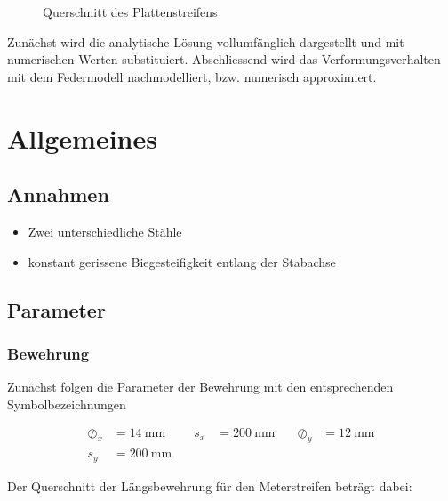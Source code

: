 \documentclass[
  11pt,
  letterpaper,
]{scrreprt}
\providecommand{\tightlist}{%
  \setlength{\itemsep}{0pt}\setlength{\parskip}{0pt}}\usepackage{longtable,booktabs,array}
\begin{document}
\begin{figure}[H]


\caption{\label{fig-jag_system_qs}Querschnitt des Plattenstreifens}

\end{figure}%

Zunächst wird die analytische Lösung vollumfänglich dargestellt und mit
numerischen Werten substituiert. Abschliessend wird das
Verformungsverhalten mit dem Federmodell nachmodelliert, bzw. numerisch
approximiert.

\section{Allgemeines}\label{allgemeines}

\subsection{Annahmen}\label{annahmen}

\begin{itemize}
\tightlist
\item
  Zwei unterschiedliche Stähle
\item
  konstant gerissene Biegesteifigkeit entlang der Stabachse
\end{itemize}

\subsection{Parameter}\label{parameter}

\subsubsection{Bewehrung}\label{bewehrung}

Zunächst folgen die Parameter der Bewehrung mit den entsprechenden
Symbolbezeichnungen

\[
\begin{aligned}
\oslash_{x}& = 14 \ \mathrm{mm} \quad & s_{x}& = 200 \ \mathrm{mm} \quad & \oslash_{y}& = 12 \ \mathrm{mm} \\ 
s_{y}& = 200 \ \mathrm{mm} \quad &  \quad &  
 \end{aligned}
\]

Der Querschnitt der Längsbewehrung für den Meterstreifen beträgt dabei:
\end{document}
